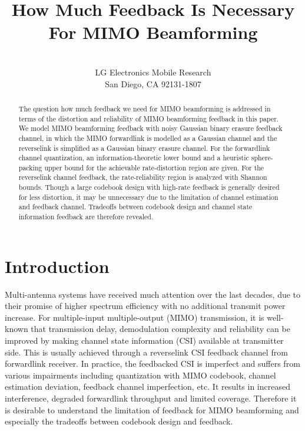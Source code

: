 \documentclass[10pt,fleqn, twocolumn]{IEEEtran}
\title{How Much Feedback Is Necessary For MIMO Beamforming}
\author{\\LG Electronics Mobile Research\\San Diego, CA 92131-1807}
\date{}
\begin{document}
\maketitle
\begin{abstract}\small
The question how much feedback we need for MIMO beamforming is
addressed in terms of the distortion and reliability of MIMO
beamforming feedback in this paper. We model MIMO beamforming
feedback with noisy Gaussian binary erasure feedback channel, in
which the MIMO forwardlink is modelled as a Gaussian channel and
the reverselink is simplified as a Gaussian binary erasure
channel. For the forwardlink channel quantization, an
information-theoretic lower bound and a heuristic sphere-packing
upper bound for the achievable rate-distortion region are given.
For the reverselink channel feedback, the rate-reliability region
is analyzed with Shannon bounds. Though a large codebook design
with high-rate feedback is generally desired for less distortion,
it may be unnecessary due to the limitation of channel estimation
and feedback channel. Tradeoffs between codebook design and
channel state information feedback are therefore revealed.
\end{abstract}

\section{Introduction}
Multi-antenna systems have received much attention over the last
decades, due to their promise of higher spectrum efficiency with
no additional transmit power increase. For multiple-input
multiple-output (MIMO) transmission, it is well-known that
transmission delay, demodulation complexity and reliability can be
improved by making channel state information (CSI) available at
transmitter side. This is usually achieved through a reverselink
CSI feedback channel from forwardlink receiver. In practice, the
feedbacked CSI is imperfect and suffers from various impairments
including quantization with MIMO codebook, channel estimation
deviation, feedback channel imperfection, etc. It results in
increased interference, degraded forwardlink throughput and
limited coverage. Therefore it is desirable to understand the
limitation of feedback for MIMO beamforming and especially the
tradeoffs between codebook design and feedback.
\end{document}
